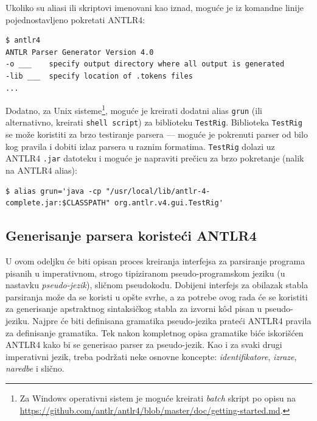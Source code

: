 Ukoliko su aliasi ili skriptovi imenovani kao iznad, moguće je iz komandne linije pojednostavljeno pokretati ANTLR4:  
\begin{lstlisting}[language={}]
$ antlr4
ANTLR Parser Generator Version 4.0
-o ___    specify output directory where all output is generated
-lib ___  specify location of .tokens files
...
\end{lstlisting}

Dodatno, za Unix sisteme\footnote{Za Windows operativni sistem je moguće kreirati \emph{batch} skript po opisu na \url{https://github.com/antlr/antlr4/blob/master/doc/getting-started.md}.}, moguće je kreirati dodatni alias \texttt{grun} (ili alternativno, kreirati \texttt{shell script}) za biblioteku \texttt{TestRig}. Biblioteka \texttt{TestRig} se može koristiti za brzo testiranje parsera --- moguće je pokrenuti parser od bilo kog pravila i dobiti izlaz parsera u raznim formatima. \texttt{TestRig} dolazi uz ANTLR4 \texttt{.jar} datoteku i moguće je napraviti prečicu za brzo pokretanje (nalik na ANTLR4 alias):
\begin{lstlisting}[language={}]
$ alias grun='java -cp "/usr/local/lib/antlr-4-complete.jar:$CLASSPATH" org.antlr.v4.gui.TestRig'
\end{lstlisting}


\subsection{Generisanje parsera koristeći ANTLR4}
\label{subsec:ANTLRParserGeneration}

U ovom odeljku će biti opisan proces kreiranja interfejsa za parsiranje programa pisanih u imperativnom, strogo tipiziranom pseudo-programskom jeziku (u nastavku \emph{pseudo-jezik}), sličnom pseudokodu. Dobijeni interfejs za obilazak stabla parsiranja može da se koristi u opšte svrhe, a za potrebe ovog rada će se koristiti za generisanje apstraktnog sintaksičkog stabla za izvorni k\^od pisan u pseudo-jeziku. Najpre će biti definisana gramatika pseudo-jezika prateći ANTLR4 pravila za definisanje gramatika. Tek nakon kompletnog opisa gramatike biće iskorišćen ANTLR4 kako bi se generisao parser za pseudo-jezik. Kao i za svaki drugi imperativni jezik, treba podržati neke osnovne koncepte: \emph{identifikatore}, \emph{izraze}, \emph{naredbe} i slično.

